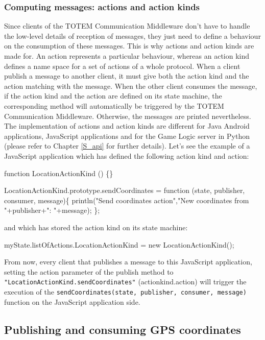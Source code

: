 \subsubsection{Computing messages: actions and action kinds}
\label{SSS_actions}
Since clients of the TOTEM Communication Middleware don't have to
handle the low-level details of reception of messages, they just need
to define a behaviour on the consumption of these messages. This is
why actions and action kinds are made for. An action represents a
particular behaviour, whereas an action kind defines a name space for
a set of actions of a whole protocol. When a client publish a message
to another client, it must give both the action kind and the action
matching with the message. When the other client consumes the message,
if the action kind and the action are defined on its state machine,
the corresponding method will automatically be triggered by the TOTEM
Communication Middleware. Otherwise, the messages are printed
nevertheless.  The implementation of actions and action kinds are
different for Java Android applications, JavaScript applications and
for the Game Logic server in Python (please refer to Chapter \ref{S_api}
for further details).  Let's see the example of a JavaScript
application which has defined the following action kind and action:
\begin{shellcmd}
function LocationActionKind () \{\}

LocationActionKind.prototype.sendCoordinates = function (state, publisher, consumer, message)\{ 
      println("Send coordinates action","New coordinates from "+publisher+": "+message); 
\};
\end{shellcmd}
and which has stored the action kind on its state machine:
\begin{shellcmd}
myState.listOfActions.LocationActionKind = new LocationActionKind();
\end{shellcmd}

From now, every client that publishes a message to this JavaScript
application, setting the action parameter of the publish method to
\texttt{"LocationActionKind.sendCoordinates"}
(\textsf{actionkind.action}) will trigger the execution of the
\texttt{sendCoordinates(state, publisher, consumer, message)} function
on the JavaScript application side.

\subsection{Publishing and consuming GPS coordinates}
\label{SS_sending_computing_GPS}

